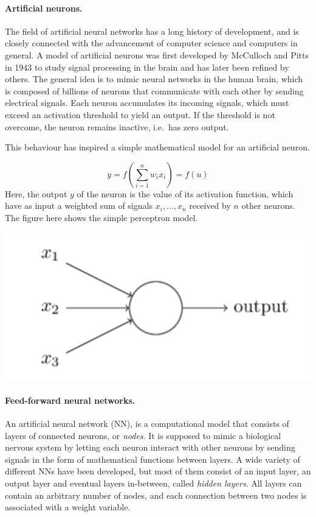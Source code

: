 \documentclass[%
oneside,                 %
final,                   %
10pt]{article}
\begin{document}
\paragraph{Artificial neurons.}
The field of artificial neural networks has a long history of
development, and is closely connected with the advancement of computer
science and computers in general. A model of artificial neurons was
first developed by McCulloch and Pitts in 1943 to study signal
processing in the brain and has later been refined by others. The
general idea is to mimic neural networks in the human brain, which is
composed of billions of neurons that communicate with each other by
sending electrical signals.  Each neuron accumulates its incoming
signals, which must exceed an activation threshold to yield an
output. If the threshold is not overcome, the neuron remains inactive,
i.e.~has zero output.

This behaviour has inspired a simple mathematical model for an artificial neuron.

\[
 y = f\left(\sum_{i=1}^n w_ix_i\right) = f(u)
\]
Here, the output $y$ of the neuron is the value of its activation function, which have as input
a weighted sum of signals $x_i, \dots ,x_n$ received by $n$ other neurons. The figure here shows the simple perceptron model.



\vspace{6mm}

\centerline{\includegraphics[width=0.9\linewidth]{figures/perceptron.png}}

\vspace{6mm}



\paragraph{Feed-forward neural networks.}
An artificial neural network (NN), is a computational model that
consists of layers of connected neurons, or \emph{nodes}.  It is supposed
to mimic a biological nervous system by letting each neuron interact
with other neurons by sending signals in the form of mathematical
functions between layers.  A wide variety of different NNs have been
developed, but most of them consist of an input layer, an output layer
and eventual layers in-between, called \emph{hidden layers}. All layers can
contain an arbitrary number of nodes, and each connection between two
nodes is associated with a weight variable.
\end{document}
